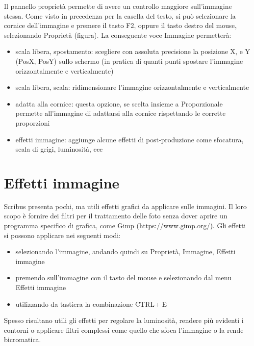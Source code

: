 \documentclass[a4paper, 12pt]{book}
\begin{document}
Il pannello proprietà permette di avere un controllo maggiore sull'immagine stessa. Come visto in precedenza per la casella del testo, si può selezionare la cornice dell'immagine e premere il tasto F2, oppure il tasto destro del mouse, selezionando Proprietà (figura). La conseguente voce Immagine permetterà:

\begin{itemize}
	\item  scala libera, spostamento: scegliere con assoluta precisione la posizione X, e Y (PosX, PosY) sullo schermo (in pratica di quanti punti spostare l'immagine orizzontalmente e verticalmente)

	\item scala libera, scala: ridimensionare l'immagine orizzontalmente e verticalmente
	
	\item adatta alla cornice: questa opzione, se scelta insieme a Proporzionale permette all'immagine di adattarsi alla cornice rispettando le corrette proporzioni

	\item effetti immagine: aggiunge alcune effetti di post-produzione come sfocatura, scala di grigi, luminosità, ecc
\end{itemize}
	
\section{Effetti immagine}
Scribus presenta pochi, ma utili effetti grafici da applicare sulle immagini. Il loro scopo è fornire dei filtri per il trattamento delle foto senza dover aprire un programma specifico di grafica, come Gimp (https://www.gimp.org/). Gli effetti si possono applicare nei seguenti modi:

\begin{itemize}
	\item selezionando l'immagine, andando quindi su Proprietà, Immagine, Effetti immagine
	
	\item premendo sull'immagine con il tasto del mouse e selezionando dal menu Effetti immagine

	\item utilizzando da tastiera la combinazione CTRL+ E
\end{itemize}

Spesso risultano utili gli effetti per regolare la luminosità, rendere più evidenti i contorni o applicare filtri complessi come quello che sfoca l'immagine o la rende bicromatica.
\end{document}
